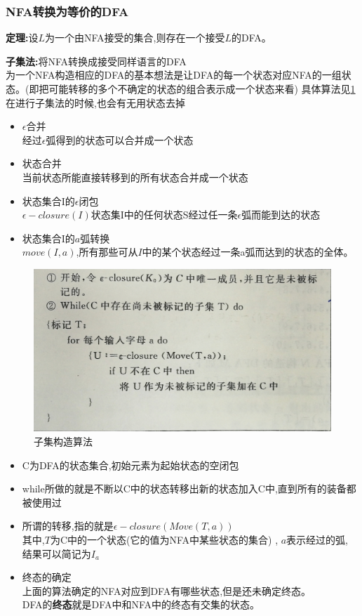 \subsubsection{NFA转换为等价的DFA}
\textbf{定理:}设$L$为一个由NFA接受的集合,则存在一个接受$L$的DFA。

\spaceline
\textbf{子集法:}将NFA转换成接受同样语言的DFA\\
为一个NFA构造相应的DFA的基本想法是让DFA的每一个状态对应NFA的一组状态。(即把可能转移的多个不确定的状态的组合表示成一个状态来看)
具体算法见\ref{fig-zijifa}{\color{blue}在进行子集法的时候,也会有无用状态去掉}

\begin{itemize}
 \item $\epsilon$合并\\
       经过$\epsilon$弧得到的状态可以合并成一个状态
 \item 状态合并\\
       当前状态所能直接转移到的所有状态合并成一个状态
 \item 状态集合I的$\epsilon$闭包\\
       $\epsilon-closure(I)$状态集I中的任何状态S经过任一条$\epsilon$弧而能到达的状态
 \item 状态集合I的$a$弧转换\\
       $move(I,a)$,所有那些可从$I$中的某个状态经过一条a弧而达到的状态的全体。
\end{itemize}

\begin{figure}[H]
 \centering
 \includegraphics[scale = 0.1]{assets/CompilerConstructionPrinciples_763bd.png}
 \caption{子集构造算法}
 \label{fig-zijifa}
\end{figure}

\begin{itemize}
 \item C为DFA的状态集合,初始元素为起始状态的空闭包
 \item while所做的就是不断以C中的状态转移出新的状态加入C中,直到所有的装备都被使用过
 \item 所谓的转移,指的就是$\epsilon-closure(Move(T,a))$\\
       其中,$T$为C中的一个状态(它的值为NFA中某些状态的集合) , $a$表示经过的弧, 结果可以简记为$I_a$
 \item 终态的确定\\
       上面的算法确定的NFA对应到DFA有哪些状态,但是还未确定终态。\\
       DFA的\textbf{终态}就是DFA中和NFA中的终态有交集的状态。
\end{itemize}

